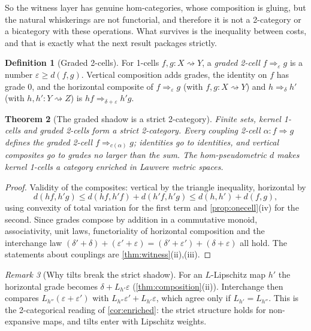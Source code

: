 \documentclass[11pt]{article}
\newtheorem{theorem}{Theorem}[section]
\theoremstyle{definition}
\newtheorem{definition}[theorem]{Definition}
\theoremstyle{remark}
\newtheorem{remark}[theorem]{Remark}
\begin{document}
So the witness layer has genuine hom-categories, whose composition is gluing, but the natural
whiskerings are not functorial, and therefore it is not a 2-category or a bicategory with these
operations. What survives is the inequality between costs, and that is exactly what the next result
packages strictly.

\begin{definition}[Graded 2-cells]\label{def:graded}
For 1-cells $f,g\colon X\rightsquigarrow Y$, a \emph{graded 2-cell} $f\Rightarrow_\varepsilon g$ is a
number $\varepsilon\ge d(f,g)$. Vertical composition adds grades, the identity on $f$ has grade $0$,
and the horizontal composite of $f\Rightarrow_\varepsilon g$ (with $f,g\colon X\rightsquigarrow Y$) and
$h\Rightarrow_\delta h'$ (with $h,h'\colon Y\rightsquigarrow Z$) is $hf\Rightarrow_{\delta+\varepsilon}h'g$.
\end{definition}

\begin{theorem}[The graded shadow is a strict 2-category]\label{thm:shadow}
Finite sets, kernel 1-cells and graded 2-cells form a strict 2-category. Every coupling 2-cell
$\alpha\colon f\Rightarrow g$ defines the graded 2-cell $f\Rightarrow_{c(\alpha)}g$; identities go to
identities, and vertical composites go to grades no larger than the sum. The hom-pseudometric $d$
makes kernel 1-cells a category enriched in Lawvere metric spaces.
\end{theorem}
\begin{proof}
Validity of the composites: vertical by the triangle inequality, horizontal by
\[
d(hf,h'g)\le d(hf,h'f)+d(h'f,h'g)\le d(h,h')+d(f,g),
\]
using convexity of total variation for the first term and \cref{prop:onecell}(iv) for the second.
Since grades compose by addition in a commutative monoid, associativity, unit laws, functoriality of
horizontal composition and the interchange law
$(\delta'+\delta)+(\varepsilon'+\varepsilon)=(\delta'+\varepsilon')+(\delta+\varepsilon)$ all hold.
The statements about couplings are \cref{thm:witness}(ii),(iii).
\end{proof}

\begin{remark}[Why tilts break the strict shadow]
For an $L$-Lipschitz map $h'$ the horizontal grade becomes $\delta+L_{h'}\varepsilon$
(\cref{thm:composition}(ii)). Interchange then compares $L_{h''}(\varepsilon+\varepsilon')$ with
$L_{h''}\varepsilon'+L_{h'}\varepsilon$, which agree only if $L_{h'}=L_{h''}$. This is the 2-categorical
reading of \cref{cor:enriched}: the strict structure holds for non-expansive maps, and tilts enter
with Lipschitz weights.
\end{remark}
\end{document}
